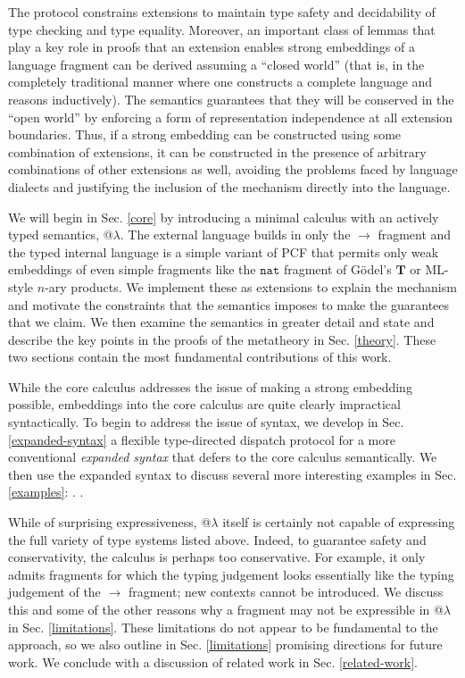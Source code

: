 \documentclass[9pt,preprint]{sigplanconf}
\begin{document}
The protocol constrains extensions to maintain type safety and decidability of type checking and type equality. Moreover, an important class of lemmas that play a key role in  proofs that an extension enables strong embeddings of a language fragment can be derived assuming a ``closed world'' (that is, in the completely traditional manner where one constructs a complete language and reasons inductively). The semantics guarantees that they will be conserved in the  ``open world'' by enforcing a form of  representation independence at all extension boundaries. Thus, if a strong embedding can be constructed using some combination of extensions, it can be constructed in the presence of arbitrary combinations of other extensions as well, avoiding the problems faced by language dialects and justifying the inclusion of the mechanism directly into the language.

We will begin in Sec. \ref{core} by introducing a minimal calculus with an actively typed semantics, @$\lambda$. The external language builds in only the $\rightarrow$ fragment and the typed internal language is a simple variant of PCF that permits only weak embeddings of even simple fragments like the $\mathtt{nat}$ fragment of G\"odel's $\mathbf{T}$ or ML-style $n$-ary products. We implement these as extensions to explain the mechanism and motivate the constraints that the semantics imposes to make the guarantees that we claim. We then examine the semantics in greater detail and state and describe the key points in the proofs of the metatheory in Sec. \ref{theory}. These two sections contain the most fundamental contributions of this work.

While the core calculus addresses the issue of making a strong embedding possible, embeddings into the core calculus are quite clearly impractical syntactically. To begin to address the issue of syntax, we develop in Sec. \ref{expanded-syntax} a flexible type-directed dispatch protocol for a more conventional \emph{expanded syntax} that defers to the core calculus semantically. We then use the expanded syntax to discuss several more interesting examples in Sec. \ref{examples}: . . 

While of surprising expressiveness, @$\lambda$ itself is certainly not capable of expressing the full variety of type systems listed above. Indeed, to guarantee safety and conservativity, the calculus is perhaps too conservative. For example, it only admits fragments for which the typing judgement looks essentially like the typing judgement of the $\rightarrow$ fragment; new contexts cannot be introduced. We discuss this and some of the other reasons why a fragment may not be expressible in @$\lambda$ in Sec. \ref{limitations}. These limitations do not appear to be fundamental to the approach, so we also outline in Sec. \ref{limitations} promising directions for future work. We conclude with a discussion of related work in Sec. \ref{related-work}. 
\end{document}
